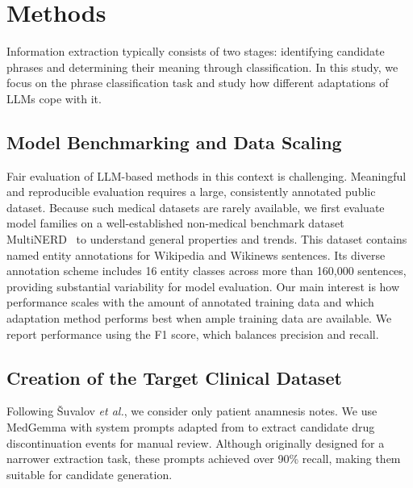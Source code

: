 \section{Methods}

Information extraction typically consists of two stages: identifying
candidate phrases and determining their meaning through
classification. In this study, we focus on the phrase classification
task and study how different adaptations of LLMs cope with it.

\subsection{Model Benchmarking and Data Scaling}

Fair evaluation of LLM-based methods in this context is challenging.
Meaningful and reproducible evaluation requires a large, consistently
annotated public dataset. Because such medical datasets are rarely
available, we first evaluate model families on a well-established
non-medical benchmark dataset
MultiNERD~\cite{tedeschi-navigli-2022-multinerd} to understand
general properties and trends. This dataset contains named entity
annotations for Wikipedia and Wikinews sentences. Its diverse
annotation scheme includes 16 entity classes across more than 160,000
sentences, providing substantial variability for model evaluation.
Our main interest is how performance scales with the amount of
annotated training data and which adaptation method performs best
when ample training data are available. We report performance using
the F1 score, which balances precision and recall.

\subsection{Creation of the Target Clinical Dataset}

Following \v{S}uvalov \emph{et al.}, we consider only patient
anamnesis notes. We use MedGemma with system prompts adapted from
\cite{suvalov-2026-extract} to extract candidate drug discontinuation
events for manual review. Although originally designed for a narrower
extraction task, these prompts achieved over 90\% recall, making them
suitable for candidate generation.

